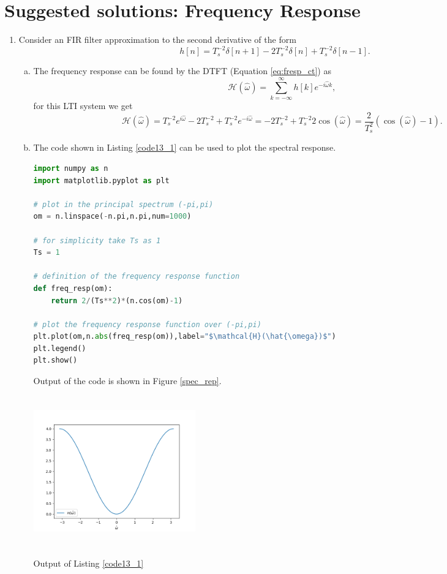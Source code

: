 \newpage
\section{Suggested solutions: Frequency Response}


\begin{enumerate}
\item Consider an FIR filter approximation to the second derivative of the form
$$h[n]=T_{s}^{-2}\delta[n+1]-2T_{s}^{-2}\delta[n]+T_{s}^{-2}\delta[n-1].$$

\begin{enumerate}[a)]
\item The frequency response can be found by the DTFT (Equation \ref{eq:fresp_ct}) as
$$\mathcal{H}(\hat{\omega})=\sum_{k=-\infty}^{\infty}h[k]e^{-i\hat{\omega}k},$$
for this LTI system we get
$$\mathcal{H}(\hat{\omega})=T_{s}^{-2}e^{i\hat{\omega}}-2T_{s}^{-2}+T_{s}^{-2}e^{-i\hat{\omega}}=-2T_{s}^{-2}+T_{s}^{-2}2\cos(\hat{\omega})=\frac{2}{T_{s}^{2}}(\cos(\hat{\omega})-1).$$

\item The code shown in Listing \ref{code13_1} can be used to plot the spectral response. 
\begin{lstlisting}[language=Python, caption=Frequency response for finite difference,label=code13_1]
import numpy as n
import matplotlib.pyplot as plt

# plot in the principal spectrum (-pi,pi)
om = n.linspace(-n.pi,n.pi,num=1000)

# for simplicity take Ts as 1
Ts = 1

# definition of the frequency response function
def freq_resp(om):
    return 2/(Ts**2)*(n.cos(om)-1)

# plot the frequency response function over (-pi,pi)
plt.plot(om,n.abs(freq_resp(om)),label="$\mathcal{H}(\hat{\omega})$")
plt.legend()
plt.show()
\end{lstlisting}
Output of the code is shown in Figure \ref{spec_rep}.
\begin{marginfigure}
    \includegraphics[width=7.0cm,height=6.5cm]{ch11/figures/freq13.png}
    \caption{Output of Listing \ref{code13_1}}
    \label{spec_rep}
\end{marginfigure}


\end{enumerate}
\end{enumerate}
